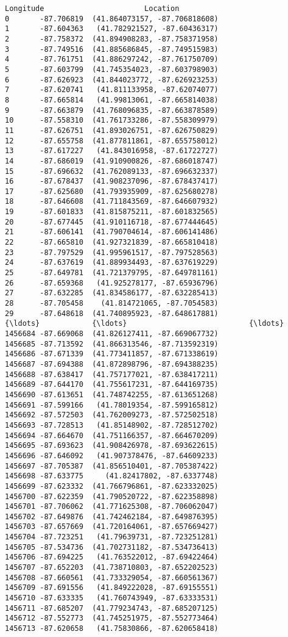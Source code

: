 \documentclass[11pt]{article}
\begin{document}
\begin{Verbatim}[commandchars=\\\{\}]
         Longitude                       Location  
0       -87.706819  (41.864073157, -87.706818608)  
1       -87.604363   (41.782921527, -87.60436317)  
2       -87.758372  (41.894908283, -87.758371958)  
3       -87.749516  (41.885686845, -87.749515983)  
4       -87.761751  (41.886297242, -87.761750709)  
5       -87.603799  (41.745354023, -87.603798903)  
6       -87.626923  (41.844023772, -87.626923253)  
7       -87.620741   (41.811133958, -87.62074077)  
8       -87.665814   (41.99813061, -87.665814038)  
9       -87.663879  (41.768096835, -87.663878589)  
10      -87.558310  (41.761733286, -87.558309979)  
11      -87.626751  (41.893026751, -87.626750829)  
12      -87.655758  (41.877811861, -87.655758012)  
13      -87.617227   (41.843016958, -87.61722727)  
14      -87.686019  (41.910900826, -87.686018747)  
15      -87.696632  (41.762089133, -87.696632337)  
16      -87.678437  (41.908237096, -87.678437417)  
17      -87.625680  (41.793935909, -87.625680278)  
18      -87.646608  (41.711843569, -87.646607932)  
19      -87.601833  (41.815875211, -87.601832565)  
20      -87.677445  (41.910116718, -87.677444645)  
21      -87.606141  (41.790704614, -87.606141486)  
22      -87.665810  (41.927321839, -87.665810418)  
23      -87.797529  (41.995961517, -87.797528563)  
24      -87.637619  (41.889934493, -87.637619229)  
25      -87.649781  (41.721379795, -87.649781161)  
26      -87.659368   (41.925278177, -87.65936796)  
27      -87.632285  (41.834586177, -87.632285413)  
28      -87.705458    (41.814721065, -87.7054583)  
29      -87.648618  (41.740895923, -87.648617881)  
{\ldots}            {\ldots}                            {\ldots}  
1456684 -87.669068  (41.826127411, -87.669067732)  
1456685 -87.713592  (41.866313546, -87.713592319)  
1456686 -87.671339  (41.773411857, -87.671338619)  
1456687 -87.694388  (41.872898796, -87.694388235)  
1456688 -87.638417  (41.757177021, -87.638417211)  
1456689 -87.644170  (41.755617231, -87.644169735)  
1456690 -87.613651  (41.748742255, -87.613651268)  
1456691 -87.599166   (41.78019354, -87.599165812)  
1456692 -87.572503  (41.762009273, -87.572502518)  
1456693 -87.728513   (41.85148902, -87.728512702)  
1456694 -87.664670  (41.751166357, -87.664670209)  
1456695 -87.693623  (41.908426978, -87.693622615)  
1456696 -87.646092   (41.907378476, -87.64609233)  
1456697 -87.705387  (41.856510401, -87.705387422)  
1456698 -87.633775     (41.82417802, -87.6337748)  
1456699 -87.623332  (41.766796861, -87.623332025)  
1456700 -87.622359  (41.790520722, -87.622358898)  
1456701 -87.706062  (41.771625308, -87.706062047)  
1456702 -87.649876  (41.742462184, -87.649876395)  
1456703 -87.657669  (41.720164061, -87.657669427)  
1456704 -87.723251   (41.79639731, -87.723251281)  
1456705 -87.534736  (41.702731182, -87.534736413)  
1456706 -87.694225   (41.763522012, -87.69422464)  
1456707 -87.652203  (41.738710803, -87.652202523)  
1456708 -87.660561  (41.733329054, -87.660561367)  
1456709 -87.691556   (41.849222028, -87.69155551)  
1456710 -87.633335   (41.760743949, -87.63333531)  
1456711 -87.685207  (41.779234743, -87.685207125)  
1456712 -87.552773  (41.745251975, -87.552773464)  
1456713 -87.620658   (41.75830866, -87.620658418)  


\end{Verbatim}
\end{document}

